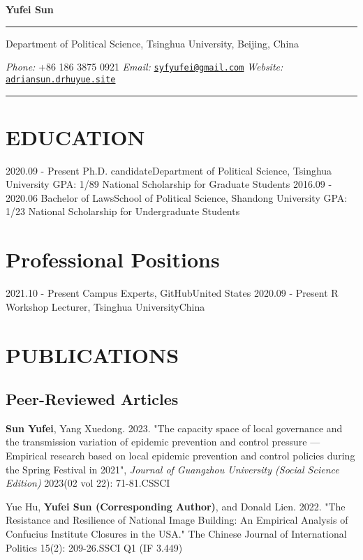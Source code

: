 \documentclass[11pt,a4paper]{article}
\begin{document}
\centerline{\huge \bf Yufei Sun}
\vspace{2mm}
\hrule
\vspace{2mm}
\centerline{Department of Political Science, Tsinghua University, Beijing, China}
\centerline{\emph{Phone:} +86 186 3875 0921 \emph{Email:} \href{mailto:syfyufei@gmail.com}{\nolinkurl{syfyufei@gmail.com}} \hspace{1mm} \emph{Website:} \href{https://adriansun.drhuyue.site/}{\tt adriansun.drhuyue.site}}
\vspace{2mm}
\hrule

\section*{EDUCATION}
2020.09 - Present Ph.D. candidate\hfill Department of Political Science, Tsinghua University
\hfill GPA: 1/89 National Scholarship for Graduate Students
2016.09 - 2020.06 Bachelor of Laws\hfill School of Political Science, Shandong University
\hfill GPA: 1/23 National Scholarship for Undergraduate Students

\section*{Professional Positions}
2021.10 - Present Campus Experts, GitHub\hfill United States
2020.09 - Present R Workshop Lecturer, Tsinghua University\hfill China

\section*{PUBLICATIONS}
\subsection*{Peer-Reviewed Articles}
\begin{spacing}{1}
\textbf{Sun Yufei}, Yang Xuedong. 2023. "The capacity space of local governance and the transmission variation of epidemic prevention and control pressure —Empirical research based on local epidemic prevention and control policies during the Spring Festival in 2021", \textit{Journal of Guangzhou University (Social Science Edition)} 2023(02 vol 22): 71-81.\hfill CSSCI
\end{spacing}

\begin{spacing}{1}
Yue Hu, \textbf{Yufei Sun (Corresponding Author)}, and Donald Lien. 2022. "The Resistance and Resilience of National Image Building: An Empirical Analysis of Confucius Institute Closures in the USA." The Chinese Journal of International Politics 15(2): 209-26.\hfill SSCI Q1 (IF 3.449)
\end{spacing}
\end{document}
